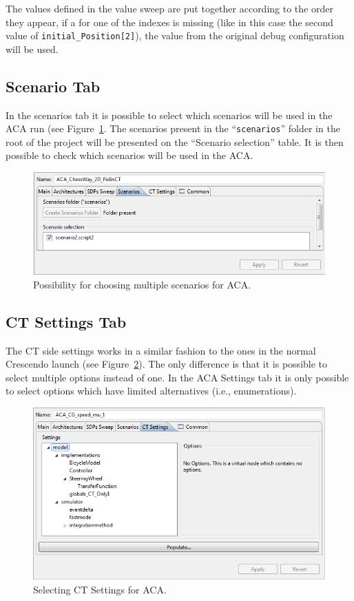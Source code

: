 \documentclass{crescendorepchap}
\begin{document}
The values defined in the value sweep are put together according to the
order they appear, if a for one of the indexes is missing (like in this
case the second value of \texttt{initial\_Position{[}2{]}}), the value from the
original debug configuration will be used.

\subsection{Scenario Tab}

In the scenarios tab it is possible to select which scenarios will be
used in the ACA run (see Figure~\ref{fig:ScenariosACATab}. 
The scenarios present in the ``\texttt{scenarios}'' folder
in the root of the project will be presented on the ``Scenario
selection'' table. It is then possible to check which scenarios will be
used in the ACA.

\begin{figure}[htbp]
\centering
\includegraphics[width=.6\textwidth]{images/ScenariosACATab.PNG}
\caption{Possibility for choosing multiple scenarios for ACA.\label{fig:ScenariosACATab}}
\end{figure}

\subsection{CT Settings Tab}

The CT side settings works in a similar fashion to the ones in
the normal
Crescendo launch (see Figure~\ref{fig:SettingsACATab}). 
The only difference is that it is possible to select
multiple options instead of one. In the ACA Settings tab it is only
possible to select options which have limited alternatives (i.e.,
enumerations).

\begin{figure}[htbp]
\centering
\includegraphics[width=.6\textwidth]{images/SettingsACATab.png}
\caption{Selecting CT Settings for ACA.\label{fig:SettingsACATab}}
\end{figure}
\end{document}
